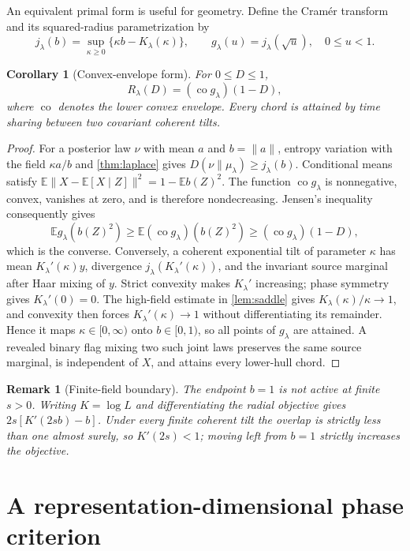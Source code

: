 \documentclass[11pt,a4paper]{article}
\newtheorem{corollary}[theorem]{Corollary}
\newtheorem{remark}[theorem]{Remark}
\newcommand{\E}{\mathbb E}
\begin{document}
An equivalent primal form is useful for geometry.  Define the Cram\'er
transform and its squared-radius parametrization by
\[
 j_\lambda(b)=\sup_{\kappa\ge0}
 \{\kappa b-K_\lambda(\kappa)\},\qquad
 g_\lambda(u)=j_\lambda(\sqrt u),\quad 0\le u<1.
 \tag{4.8}
\]

\begin{corollary}[Convex-envelope form]\label{cor:convex-envelope}
For $0\le D\le1$,
\[
 R_\lambda(D)=(\operatorname{co}g_\lambda)(1-D),
 \tag{4.9}
\]
where $\operatorname{co}$ denotes the lower convex envelope.  Every chord
is attained by time sharing between two covariant coherent tilts.
\end{corollary}

\begin{proof}
For a posterior law $\nu$ with mean $a$ and $b=\|a\|$, entropy variation
with the field $\kappa a/b$ and \cref{thm:laplace} gives
$D(\nu\|\mu_\lambda)\ge j_\lambda(b)$.  Conditional means satisfy
$\E\|X-\E[X\mid Z]\|^2=1-\E b(Z)^2$.  The function
$\operatorname{co}g_\lambda$ is nonnegative, convex, vanishes at zero, and
is therefore nondecreasing.  Jensen's inequality consequently gives
\[
 \E g_\lambda(b(Z)^2)
 \ge \E(\operatorname{co}g_\lambda)(b(Z)^2)
 \ge (\operatorname{co}g_\lambda)(1-D),
\]
which is the converse.  Conversely, a coherent exponential
tilt of parameter $\kappa$ has mean
$K_\lambda'(\kappa)y$, divergence
$j_\lambda(K_\lambda'(\kappa))$, and the invariant source marginal after
Haar mixing of $y$.  Strict convexity makes $K_\lambda'$ increasing;
phase symmetry gives $K_\lambda'(0)=0$.  The high-field estimate in
\cref{lem:saddle} gives $K_\lambda(\kappa)/\kappa\to1$, and convexity then
forces $K_\lambda'(\kappa)\to1$ without differentiating its remainder.  Hence it maps
$\kappa\in[0,\infty)$ onto $b\in[0,1)$, so all points of $g_\lambda$ are
attained.  A revealed binary flag mixing two such joint laws preserves the
same source marginal, is independent of $X$, and attains every lower-hull
chord.
\end{proof}

\begin{remark}[Finite-field boundary]
The endpoint $b=1$ is not active at finite $s>0$.  Writing
$K=\log L$ and differentiating the radial objective gives
$2s[K'(2sb)-b]$.  Under every finite coherent tilt the overlap is strictly
less than one almost surely, so $K'(2s)<1$; moving left from $b=1$ strictly
increases the objective.
\end{remark}

\section{A representation-dimensional phase criterion}
\end{document}
